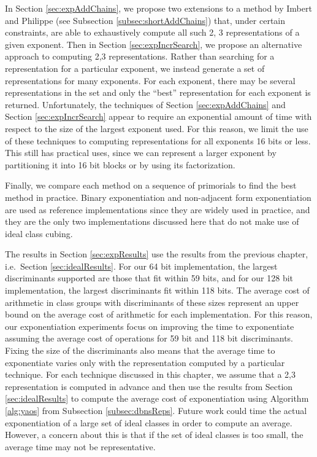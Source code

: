 \documentclass{ucalgthes1}
\theoremstyle{definition}
\begin{document}
In Section \ref{sec:expAddChains}, we propose two extensions to a method by Imbert and Philippe \mbox{\cite[\S 3]{Imbert2010b}} (see Subsection \ref{subsec:shortAddChains}) that, under certain constraints, are able to exhaustively compute all such 2, 3 representations of a given exponent.  Then in Section \ref{sec:expIncrSearch}, we propose an alternative approach to computing 2,3 representations.  Rather than searching for a representation for a particular exponent, we instead generate a set of representations for many exponents.  For each exponent, there may be several representations in the set and only the ``best'' representation for each exponent is returned.  Unfortunately, the techniques of Section \ref{sec:expAddChains} and Section \ref{sec:expIncrSearch} appear to require an exponential amount of time with respect to the size of the largest exponent used.  For this reason, we limit the use of these techniques to computing representations for all exponents 16 bits or less.  This still has practical uses, since we can represent a larger exponent by partitioning it into 16 bit blocks or by using its factorization.

Finally, we compare each method on a sequence of primorials to find the best method in practice.  Binary exponentiation and non-adjacent form exponentiation are used as reference implementations since they are widely used in practice, and they are the only two implementations discussed here that do not make use of ideal class cubing.

The results in Section \ref{sec:expResults} use the results from the previous chapter, i.e.\ Section \ref{sec:idealResults}.  For our 64 bit implementation, the largest discriminants supported are those that fit within 59 bits, and for our 128 bit implementation, the largest discriminants fit within 118 bits.  The average cost of arithmetic in class groups with discriminants of these sizes represent an upper bound on the average cost of arithmetic for each implementation.  For this reason, our exponentiation experiments focus on improving the time to exponentiate assuming the average cost of operations for 59 bit and 118 bit discriminants.  Fixing the size of the discriminants also means that the average time to exponentiate varies only with the representation computed by a particular technique.  For each technique discussed in this chapter, we assume that a 2,3 representation is computed in advance and then use the results from Section \ref{sec:idealResults} to compute the average cost of exponentiation using Algorithm \ref{alg:yaos} from Subsection \ref{subsec:dbnsReps}.  Future work could time the actual exponentiation of a large set of ideal classes in order to compute an average.  However, a concern about this is that if the set of ideal classes is too small, the average time may not be representative.
\end{document}
